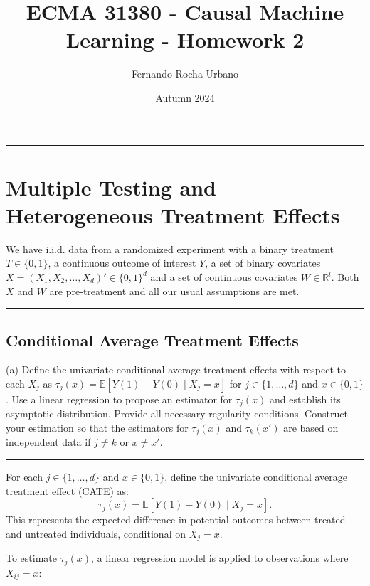 \documentclass{article}
\title{ECMA 31380 - Causal Machine Learning - Homework 2}
\author{Fernando Rocha Urbano}
\date{Autumn 2024}
\newenvironment{colorparagraph}[1]{\par\color{#1}}{\par}
\begin{document}
\maketitle

\begin{colorparagraph}{questioncolor}
\rule{\textwidth}{0.5pt}

\label{q1}\section{Multiple Testing and Heterogeneous Treatment Effects}

We have i.i.d. data from a randomized experiment with a binary treatment \( T \in \{0,1\} \), a continuous outcome of interest \( Y \), a set of binary covariates \( X = (X_1, X_2, \dots, X_d)' \in \{0,1\}^d \) and a set of continuous covariates \( W \in \mathbb{R}^l \). Both \( X \) and \( W \) are pre-treatment and all our usual assumptions are met.

\rule{\textwidth}{0.5pt}
\end{colorparagraph}

\begin{colorparagraph}{questioncolor}
\label{q1a}\subsection{Conditional Average Treatment Effects}
(a) Define the univariate conditional average treatment effects with respect to each \( X_j \) as \( \tau_j(x) = \mathbb{E}[Y(1) - Y(0) \mid X_j = x] \) for \( j \in \{1, \dots, d\} \) and \( x \in \{0, 1\} \). Use a linear regression to propose an estimator for \( \tau_j(x) \) and establish its asymptotic distribution. Provide all necessary regularity conditions. Construct your estimation so that the estimators for \( \tau_j(x) \) and \( \tau_k(x') \) are based on independent data if \( j \neq k \) or \( x \neq x' \).

\rule{\textwidth}{0.5pt}
\end{colorparagraph}

For each \( j \in \{1, \dots, d\} \) and \( x \in \{0,1\} \), define the univariate conditional average treatment effect (CATE) as:
\[
\tau_j(x) = \mathbb{E}[Y(1) - Y(0) \mid X_j = x].
\]
This represents the expected difference in potential outcomes between treated and untreated individuals, conditional on \( X_j = x \).

To estimate \( \tau_j(x) \), a linear regression model is applied to observations where \( X_{ij} = x \):
\end{document}
